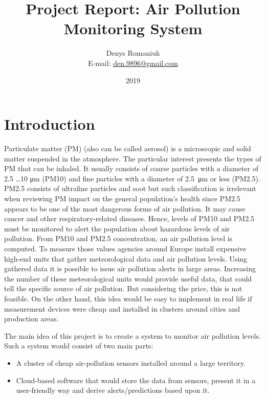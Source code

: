 \documentclass{article}
\title{Project Report: Air Pollution Monitoring System}
\author{Denys Romaniuk \\ E-mail: \href{mailto:den.9896@gmail.com}{den.9896@gmail.com}}
\date{2019}
\begin{document}
	\maketitle
	
	\newpage	
	\tableofcontents
	
	\newpage
	\section{Introduction}
	\label{sec:introduction}
	
		Particulate matter (PM) (also can be called aerosol) is a microscopic and solid matter suspended in the atmosphere. The particular interest presents the types of PM that can be inhaled. It usually consists of coarse particles with a diameter of 2.5 \ldots 10 \si{\micro\meter} (PM10) and fine particles with a diameter of \SI{2.5}{\micro\meter} or less (PM2.5). PM2.5 consists of ultrafine particles and soot but such classification is irrelevant when reviewing PM impact on the general population’s health since PM2.5 appears to be one of the most dangerous forms of air pollution. It may cause cancer and other respiratory-related diseases. Hence, levels of PM10 and PM2.5 must be monitored to alert the population about hazardous levels of air pollution. From PM10 and PM2.5 concentration, an air pollution level is computed. To measure those values agencies around Europe install expensive high-end units that gather meteorological data and air pollution levels. Using gathered data it is possible to issue air pollution alerts in large areas. Increasing the number of these meteorological units would provide useful data, that could tell the specific source of air pollution. But considering the price, this is not feasible. On the other hand, this idea would be easy to implement in real life if measurement devices were cheap and installed in clusters around cities and production areas.
		
		The main idea of this project is to create a system to monitor air pollution levels. Such a system would consist of two main parts:
		\begin{itemize}
			\item A cluster of cheap air-pollution sensors installed around a large territory.
			\item Cloud-based software that would store the data from sensors, present it in a user-friendly way and derive alerts/predictions based upon it.
		\end{itemize}

	\newpage
\end{document}
